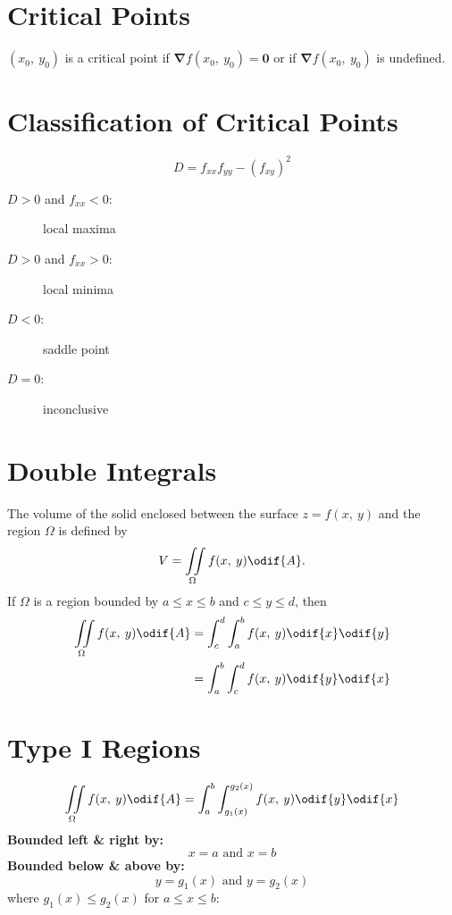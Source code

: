 \documentclass{article}
\begin{document}
\begin{multicols}{3}
    \section*{Critical Points}
    \((x_0,\: y_0)\) is a critical point if \(\symbf{\nabla}f(x_0,\: y_0) = \symbf{0}\)
    or if \(\symbf{\nabla}f(x_0,\: y_0)\) is undefined.
    \section*{Classification of Critical Points}
    \begin{equation*}
        D = f_{xx}f_{yy} - \left( f_{xy} \right)^2
    \end{equation*}
    \begin{description}
        \item[\(D > 0\) and \(f_{xx} < 0\):] local maxima
        \item[\(D > 0\) and \(f_{xx} > 0\):] local minima
        \item[\(D < 0\):] saddle point
        \item[\(D = 0\):] inconclusive
    \end{description}
    \section*{Double Integrals}
    The volume of the solid
    enclosed between the surface \(z=f(x,\: y)\) and the region \(\Omega\) is
    defined by
    \begin{equation*}
        V = \iint\limits_{\Omega} f(x,\: y) \odif{A}.
    \end{equation*}
    If \(\Omega\) is a region bounded by \(a \leq x \leq b\) and \(c \leq y \leq d\), then
    \begin{align*}
        \iint\limits_{\Omega} f(x,\: y) \odif{A} & = \int_c^d\int_a^b f(x,\: y) \odif{x} \odif{y} \\
                                               & = \int_a^b\int_c^d f(x,\: y) \odif{y} \odif{x}
    \end{align*}
    \section*{Type I Regions}
    \begin{equation*}
        \iint\limits_{\Omega} f(x,\: y) \odif{A} = \int_a^b\int_{g_1(x)}^{g_2(x)} f(x,\: y) \odif{y} \odif{x}
    \end{equation*}
    \textbf{Bounded left \& right by:}
    \begin{equation*}
        x=a \text{ and } x=b
    \end{equation*}
    \textbf{Bounded below \& above by:}
    \begin{equation*}
        y=g_1(x) \text{ and } y=g_2(x)
    \end{equation*}
    where \(g_1(x) \leq g_2(x)\) for \(a \leq x \leq b\):

\end{multicols}
\end{document}
